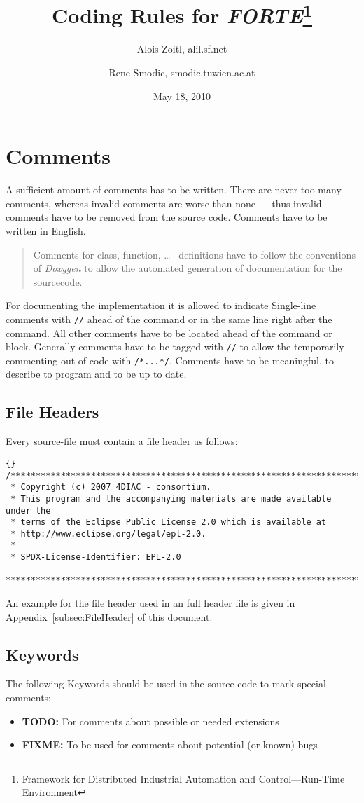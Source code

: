 \documentclass[final,a4paper,10pt, oneside]{article}
\title{Coding Rules for \emph{FORTE}\footnote{Framework for Distributed Industrial Automation and Control---Run-Time Environment}}
\author{Alois Zoitl, alil\@@users.sf.net \and Rene Smodic, smodic\@@acin.tuwien.ac.at}
\date{May 18, 2010}
\begin{document}
\maketitle

\tableofcontents

\section{Comments}
A sufficient amount of comments has to be written. There are never too many comments, whereas invalid comments are worse than none --- thus
invalid comments have to be removed from the source code. Comments have to be written in English. 

\begin{quote}
Comments for class, function, \ldots~ definitions have to follow the conventions of \emph{Doxygen} to allow the automated generation of documentation for the sourcecode. 
\end{quote}

For documenting the implementation it is allowed to indicate Single-line
comments with \verb|//| ahead of the command or in the same line right after the command. All other comments have to be located ahead of the
command or block. Generally comments have to be tagged with \verb|//| to allow the temporarily commenting out of code with \verb|/*...*/|.
Comments have to be meaningful, to describe to program and to be up to date.


\subsection{File Headers}
Every source-file must contain a file header as follows:
\begin{lstlisting}[frame=trbl]{}
/*******************************************************************************
 * Copyright (c) 2007 4DIAC - consortium.
 * This program and the accompanying materials are made available under the
 * terms of the Eclipse Public License 2.0 which is available at
 * http://www.eclipse.org/legal/epl-2.0.
 *
 * SPDX-License-Identifier: EPL-2.0
 *******************************************************************************
\end{lstlisting}
An example for the file header used in an full header file is given in Appendix~\ref{subsec:FileHeader} of this document.

\subsection{Keywords}
The following Keywords should be used in the source code to mark special comments:
\begin{itemize}
	\item \textbf{TODO:} For comments about possible or needed extensions
	\item \textbf{FIXME:} To be used for comments about potential (or known) bugs
\end{itemize}
\end{document}
